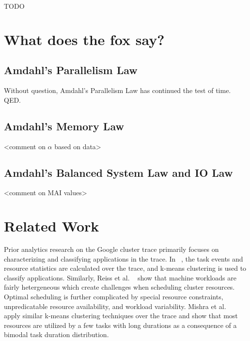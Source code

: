 \documentclass{sig-alternate}
\begin{document}
TODO

\section{What does the fox say?}

\subsection{Amdahl's Parallelism Law}

Without question, Amdahl's Parallelism Law has continued the test of time. QED.

\subsection{Amdahl's Memory Law}

<comment on $\alpha$ based on data>

\subsection{Amdahl's Balanced System Law and IO Law}

<comment on MAI values>

\section{Related Work}

Prior analytics research on the Google cluster trace primarily focuses on characterizing and classifying applications in the trace.
In ~\cite{clusterdata:Di2013}, the task events and resource statistics are calculated over the trace, and k-means clustering is used to classify applications.
Similarly, Reiss et al. ~\cite{clusterdata:Reiss2012b} show that machine workloads are fairly hetergeneous which create challenges when scheduling cluster resources.
Optimal scheduling is further complicated by special resource constraints, unpredicatable resource availability, and workload variability.
Mishra et al. ~\cite{clusterdata:Mishra2010} apply similar k-means clustering techniques over the trace and show that most resources are utilized by a few tasks with long durations as a consequence of a bimodal task duration distribution.
\end{document}
